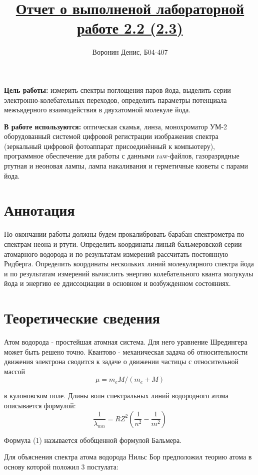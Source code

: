 \documentclass[a4paper]{article}
\title{\underline{Отчет о выполненой лабораторной работе 2.2 (2.3)}}
\author{Воронин Денис, Б04-407}
\begin{document}
\maketitle

\textbf{Цель работы:} измерить спектры поглощения паров йода, выделить серии электронно-колебательных переходов, определить параметры потенциала межъядерного взаимодействия в двухатомной молекуле йода.

\textbf{В работе используются:} оптическая скамья, линза, монохроматор УМ-2 оборудованный системой цифровой регистрации изображения спектра (зеркальный цифровой фотоаппарат присоединённый к компьютеру), программное обеспечение для работы с данными raw-файлов, газоразрядные ртутная и неоновая лампы, лампа накаливания и герметичные кюветы с парами йода.


\section{Аннотация}

По окончании работы должны будем прокалибровать барабан спектрометра по спектрам неона и ртути. Определить координаты линый бальмеровской серии атомарного водорода и по результатам измерений рассчитать постоянную Ридберга. Определить координаты нескольких линий молекулярного спектра йода и по результатам измерений вычислить энергию колебательного кванта молукулы йода и энергию ее ддиссоциации в 
основном и возбужденном состояниях.

\section{Теоретические сведения}

Атом водорода - простейшая атомная система. Для него уравнение Шредингера может быть решено точно. 
Квантово - механическая задача об относительности движения электрона сводится к задаче о движении частицы с относительной массой \[
\mu = m_e M / (m_e + M)
\]

в кулоновском поле. Длины волн спектральных линий водородного атома описывается формулой:
\[
\frac{1}{\lambda_{mn}} = R Z^2 \left( \frac{1}{n^2} - \frac{1}{m^2} \right) \tag{1}
\]

Формула (1) называется обобщенной формулой Бальмера.\par

Для объяснения спектра атома водорода Нильс Бор предположил $\textbf{теорию атома}$ в основу которой положил 3 постулата:
\end{document}
